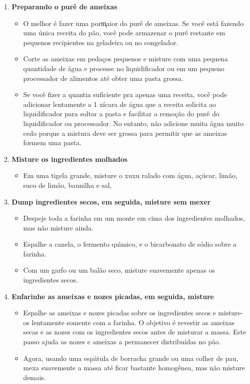 \documentclass [11pt, letterpaper] {article}
\begin{document}
\begin {description}
\begin {enumerate}
\item {\bf Preparando o purê de ameixas}
\begin {itemize}
\item O melhor é fazer uma por\c maior do purê de ameixas. Se você está fazendo uma única receita do pão, você pode armazenar o purê restante em pequenos recipientes na geladeira ou no congelador.
\item Corte as ameixas em peda\c{c}os pequenos e misture com uma pequena quantidade de água e processe no liquidificador ou em um pequeno processador de alimentos até obter uma pasta grossa.
\item Se você fizer a quantia suficiente pra apenas uma receita, você
pode adicionar lentamente a 1 xícara de água que a receita solicita ao
liquidificador para soltar a pasta e facilitar a remoção do  pur\^e do
liquidificador ou processador. No entanto, não adicione muita água
muito cedo porque a mistura deve ser grossa para permitir que as
ameixas formem uma pasta.
\end {itemize}


\item {\bf Misture os ingredientes molhados}
\begin {itemize}
\item Em uma tigela grande, misture o xuxu ralado com água, açúcar,
limão, suco de limão, baunilha e sal,
\end {itemize}

\item {\bf Dump ingredientes secos, em seguida, misture sem mexer}
\begin {itemize}
\item Despeje toda a farinha em um monte em cima dos ingredientes
molhados, mas n\~ao misture ainda.
\item Espalhe a canela, o fermento qu\'{\i}mico, e o bicarbonato de sódio sobre a farinha.
\item Com um garfo ou um bal\~ao seco, misture suavemente apenas os ingredientes secos.
\end {itemize}

\item {\bf Enfarinhe as ameixas e nozes picadas, em seguida, misture}
\begin {itemize}
\item Espalhe as ameixas  e nozes picadas sobre os
ingredientes secos e misture-os lentamente somente com a farinha. O objetivo é revestir as ameixas secas e as nozes com os ingredientes secos antes de misturar a massa. Este passo ajuda as nozes e ameixas a permanecer distribuídas no p\~ao. 
\item Agora, usando uma espátula de borracha grande ou uma colher de
pau, mexa suavemente a massa até ficar bastante homogênea, mas não
misture demais. 
\end {itemize}


\end{enumerate}
\end{description}
\end{document}
